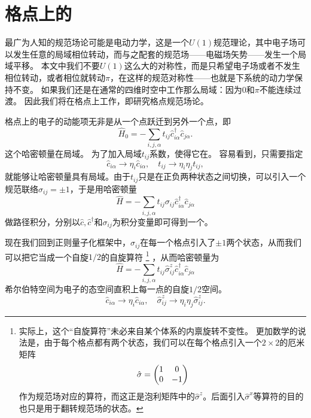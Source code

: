 \documentclass[hyperref, UTF8, a4paper]{ctexart}
\title{\Ztwo规范场论}
\author{吴何友}
\newcommand*{\concept}[1]{\underline{\textbf{#1}}}
\newcommand*{\Ztwo}{$\mathbb{Z}_2$}
\begin{document}
\maketitle

\section{格点上的}

最广为人知的规范场论可能是电动力学，这是一个$U(1)$规范理论，其中电子场可以发生任意的局域相位转动，而与之配套的规范场——电磁场矢势——发生一个局域平移。
本文中我们不要$U(1)$这么大的对称性，而是只希望电子场或者不发生相位转动，或者相位就转动$\pi$，在这样的规范对称性——也就是\concept{}下系统的动力学保持不变。
如果我们还是在通常的四维时空中工作那么局域：因为$0$和$\pi$不能连续过渡。
因此我们将在格点上工作，即研究格点规范场论。

格点上的电子的动能项无非是从一个点跃迁到另外一个点，即
\begin{equation}
    \hat{H}_0 = - \sum_{i, j, \alpha} t_{ij} \hat{c}_{i \alpha}^\dagger \hat{c}_{j \alpha}.
    \label{eq:hopping-hamiltonian}
\end{equation}
这个哈密顿量在局域。
为了加入局域$t_{ij}$系数，使得它在。
容易看到，只需要指定
\[
    \hat{c}_{i \alpha} \longrightarrow \eta_{i} \hat{c}_{i \alpha}, \quad t_{ij} \longrightarrow \eta_i \eta_j t_{ij},
\]
就能够让哈密顿量具有局域。由于$t_{ij}$只是在正负两种状态之间切换，可以引入一个规范联络$\sigma_{ij} = \pm 1$，于是用哈密顿量
\[
    \hat{H} = - \sum_{i, j, \alpha} t_{ij} \sigma_{ij} \hat{c}_{i \alpha}^\dagger \hat{c}_{j \alpha}
\]
做路径积分，分别以$\hat{c}, \hat{c}^\dagger$和$\sigma_{ij}$为积分变量即可得到一个。

现在我们回到正则量子化框架中，$\sigma_{ij}$在每一个格点引入了$\pm 1$两个状态，从而我们可以把它当成一个自旋$1/2$的自旋算符%
\footnote{实际上，这个“自旋算符”未必来自某个体系的内禀旋转不变性。
更加数学的说法是，由于每个格点都有两个状态，我们可以在每个格点引入一个$2\times 2$的厄米矩阵
\[
    \hat{\sigma} = \pmqty{1 & 0 \\ 0 & -1}
\]
作为规范场对应的算符，而这正是泡利矩阵中的$\hat{\sigma}^z$。后面引入$\hat{\sigma}^x$等算符的目的也只是用于翻转规范场的状态。
}%
，从而哈密顿量为
\begin{equation}
    \hat{H} = - \sum_{i, j, \alpha} t_{ij} \hat{\sigma}^z_{ij} \hat{c}_{i \alpha}^\dagger \hat{c}_{j \alpha}
    \label{eq:minimal-z2-couple}
\end{equation}
希尔伯特空间为电子的态空间直积上每一点的自旋$1/2$空间。
\begin{equation}
    \hat{c}_{i \alpha} \longrightarrow \eta_{i} \hat{c}_{i \alpha}, \quad \hat{\sigma}_{ij}^z \longrightarrow \eta_i \eta_j \hat{\sigma}_{ij}^z.
\end{equation}
\end{document}
